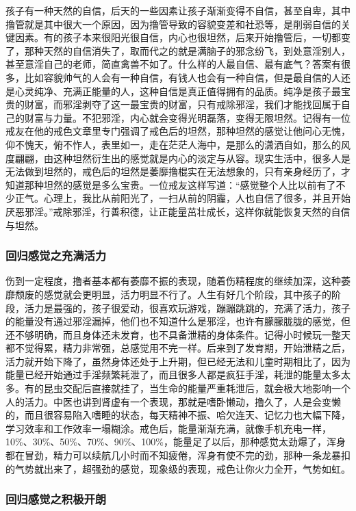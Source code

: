 孩子有一种天然的自信，后天的一些因素让孩子渐渐变得不自信，甚至自卑，其中撸管就是其中很大一个原因，因为撸管导致的容貌变差和社恐等，是削弱自信的关键因素。有的孩子本来很阳光很自信，内心也很坦然，后来开始撸管后，一切都变了，那种天然的自信消失了，取而代之的就是满脑子的邪念纷飞，到处意淫别人，甚至意淫自己的老师，简直禽兽不如了。什么样的人最自信、最有底气？答案有很多，比如容貌帅气的人会有一种自信，有钱人也会有一种自信，但是最自信的人还是心灵纯净、充满正能量的人，这种自信是真正值得拥有的品质。纯净是孩子最宝贵的财富，而邪淫剥夺了这一最宝贵的财富，只有戒除邪淫，我们才能找回属于自己的财富与力量。不犯邪淫，内心就会变得光明磊落，变得无限坦然。记得有一位戒友在他的戒色文章里专门强调了戒色后的坦然，那种坦然的感觉让他问心无愧，仰不愧天，俯不怍人，表里如一，走在茫茫人海中，是那么的潇洒自如，那么的风度翩翩，由这种坦然衍生出的感觉就是内心的淡定与从容。现实生活中，很多人是无法做到坦然的，戒色后的坦然是萎靡撸棍实在无法想象的，只有亲身经历了，才知道那种坦然的感觉是多么宝贵。一位戒友这样写道：“感觉整个人比以前有了不少正气。心理上，我比从前阳光了，一扫从前的阴霾，人也自信了很多，并且开始厌恶邪淫。”戒除邪淫，行善积德，让正能量茁壮成长，这样你就能恢复天然的自信与坦然。

\subsubsection{回归感觉之充满活力}

伤到一定程度，撸者基本都有萎靡不振的表现，随着伤精程度的继续加深，这种萎靡颓废的感觉就会更明显，活力明显不行了。人生有好几个阶段，其中孩子的阶段，活力是最强的，孩子很爱动，很喜欢玩游戏，蹦蹦跳跳的，充满了活力，孩子的能量没有通过邪淫漏掉，他们也不知道什么是邪淫，也许有朦朦胧胧的感觉，但还不够明确，而且身体还未发育，也不具备泄精的身体条件。记得小时候玩一整天都不觉得累，精力非常强，总感觉用不完一样。后来到了发育期，开始泄精之后，活力就开始下降了，虽然身体还处于上升期，但已经无法和儿童时期相比了，因为能量已经开始通过手淫频繁耗泄了，而且很多人都是疯狂手淫，耗泄的能量太多太多。有的昆虫交配后直接就挂了，当生命的能量严重耗泄后，就会极大地影响一个人的活力。中医也讲到肾虚有一个表现，那就是嗜卧懒动，撸久了，人是会变懒的，而且很容易陷入嗜睡的状态，每天精神不振、哈欠连天、记忆力也大幅下降，学习效率和工作效率一塌糊涂。戒色后，能量渐渐充满，就像手机充电一样，10\%、30\%、50\%、70\%、90\%、100\%，能量足了以后，那种感觉太劲爆了，浑身都在冒劲，精力可以续航几小时而不知疲倦，浑身有使不完的劲，那种一条龙暴扣的气势就出来了，超强劲的感觉，现象级的表现，戒色让你火力全开，气势如虹。

\subsubsection{回归感觉之积极开朗}

